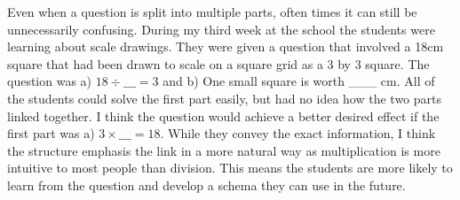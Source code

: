 \documentclass[11pt, a4paper, notitlepage]{article}
\begin{document}
\par
Even when a question is split into multiple parts, often times it can still be unnecessarily confusing. During my third week at the school the students were learning about scale drawings. They were given a question that involved a 18cm square that had been drawn to scale on a square grid as a 3 by 3 square. The question was a) $18 \div \_\_\_= 3$ and b) One small square is worth \_\_\_ cm. All of the students could solve the first part easily, but had no idea how the two parts linked together. I think the question would achieve a better desired effect if the first part was a) $3\times\_\_\_ = 18$. While they convey the exact information, I think the structure emphasis the link in a more natural way as multiplication is more intuitive to most people than division. This means the students are more likely to learn from the question and develop a schema they can use in the future.
\end{document}
